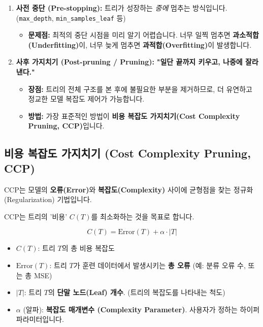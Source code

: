 \documentclass[11pt,a4paper]{book}
\theoremstyle{definition}
\begin{document}
\begin{enumerate}
    \item \textbf{사전 중단 (Pre-stopping):}
    트리가 성장하는 \textit{중에} 멈추는 방식입니다. (\texttt{max\_depth}, \texttt{min\_samples\_leaf} 등)
    \begin{itemize}
        \item \textbf{문제점:} 최적의 중단 시점을 미리 알기 어렵습니다. 너무 일찍 멈추면 \textbf{과소적합(Underfitting)}이, 너무 늦게 멈추면 \textbf{과적합(Overfitting)}이 발생합니다.
    \end{itemize}
    
    \item \textbf{사후 가지치기 (Post-pruning / Pruning):}
    \textbf{"일단 끝까지 키우고, 나중에 잘라낸다."}
    \begin{itemize}
        \item \textbf{장점:} 트리의 전체 구조를 본 후에 불필요한 부분을 제거하므로, 더 유연하고 정교한 모델 복잡도 제어가 가능합니다.
        \item \textbf{방법:} 가장 표준적인 방법이 \textbf{비용 복잡도 가지치기(Cost Complexity Pruning, CCP)}입니다.
    \end{itemize}
\end{enumerate}

\subsection{비용 복잡도 가지치기 (Cost Complexity Pruning, CCP)}

CCP는 모델의 \textbf{오류(Error)}와 \textbf{복잡도(Complexity)} 사이에 균형점을 찾는 정규화(Regularization) 기법입니다.

\begin{boxDefinition}[title={비용 복잡도 (Cost Complexity) 공식}]
    CCP는 트리의 '비용' $C(T)$를 최소화하는 것을 목표로 합니다.
    
    $$ C(T) = \text{Error}(T) + \alpha \cdot |T| $$

    \begin{itemize}
        \item $C(T)$: 트리 $T$의 총 비용 복잡도
        \item $\text{Error}(T)$: 트리 $T$가 훈련 데이터에서 발생시키는 \textbf{총 오류} (예: 분류 오류 수, 또는 총 MSE)
        \item $|T|$: 트리 $T$의 \textbf{단말 노드(Leaf) 개수}. (트리의 복잡도를 나타내는 척도)
        \item $\alpha$ (알파): \textbf{복잡도 매개변수 (Complexity Parameter)}. 사용자가 정하는 하이퍼파라미터입니다.
    \end{itemize}
\end{boxDefinition}
\end{document}
